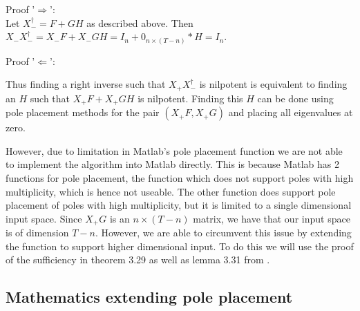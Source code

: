 Proof '$\Rightarrow$': \\
Let $X^\dagger_- = F + G H$ as described above. Then $X_- X^\dagger_- = X_- F + X_- G H = I_n + 0_{n\times (T-n)} * H = I_n$.

Proof '$\Leftarrow$': \\

Thus finding a right inverse such that $X_+ X_-^\dagger$ is nilpotent is equivalent to finding an $H$ such that $X_+ F + X_+ G H$ is nilpotent. Finding this $H$ can be done using pole placement methods for the pair $(X_+ F, X_+ G)$ and placing all eigenvalues at zero.



However, due to limitation in Matlab's pole placement function we are not able to implement the algorithm into Matlab directly. This is because Matlab has 2 functions for pole placement, the  function which does not support poles with high multiplicity, which is hence not useable. The other function  does support pole placement of poles with high multiplicity, but it is limited to a single dimensional input space. Since $X_+ G$ is an $n \times (T-n)$ matrix, we have that our input space is of dimension $T-n$. However, we are able to circumvent this issue by extending the  function to support higher dimensional input. To do this we will use the proof of the sufficiency in theorem 3.29 as well as lemma 3.31 from \cite{bookTrentelman}.

\subsection{Mathematics extending pole placement}


